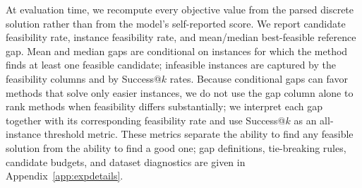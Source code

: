 \documentclass{article}
\theoremstyle{remark}
\begin{document}
At evaluation time, we recompute every objective value from the parsed discrete solution rather than from the model's self-reported score. We report candidate feasibility rate, instance feasibility rate, and mean/median best-feasible reference gap. Mean and median gaps are conditional on instances for which the method finds at least one feasible candidate; infeasible instances are captured by the feasibility columns and by Success@\(k\) rates. Because conditional gaps can favor methods that solve only easier instances, we do not use the gap column alone to rank methods when feasibility differs substantially; we interpret each gap together with its corresponding feasibility rate and use Success@\(k\) as an all-instance threshold metric. These metrics separate the ability to find any feasible solution from the ability to find a good one; gap definitions, tie-breaking rules, candidate budgets, and dataset diagnostics are given in Appendix~\ref{app:expdetails}.
\end{document}
